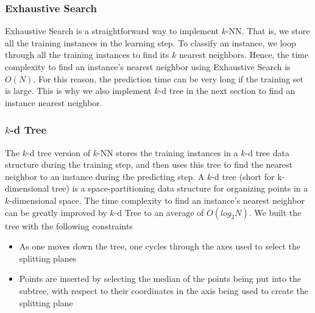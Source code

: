 \subsubsection{Exhaustive Search}
Exhaustive Search is a straightforward way to implement $k$-NN. That is, we store all the training instances in the learning step. To classify an instance, we loop through all the training instances to find its $k$ nearest neighbors. Hence, the time complexity to find an instance's nearest neighbor using Exhaustive Search is $O(N)$. For this reason, the prediction time can be very long if the training set is large. This is why we also implement $k$-d tree in the next section to find an instance nearest neighbor.

\subsubsection{$k$-d Tree}
The $k$-d tree version of $k$-NN stores the training instances in a $k$-d tree data structure during the training step, and then uses this tree to find the nearest neighbor to an instance during the predicting step. A $k$-d tree \cite{bentley1975multidimensional} (short for k-dimensional tree) is a space-partitioning data structure for organizing points in a $k$-dimensional space. The time complexity to find an instance's nearest neighbor can be greatly improved by $k$-d Tree to an average of $O(log_2N)$. We built the tree with the following constraints \cite{de2000computational}
\begin{itemize}
	\item As one moves down the tree, one cycles through the axes used to select the splitting planes
	\item Points are inserted by selecting the median of the points being put into the subtree, with respect to their coordinates in the axis being used to create the splitting plane
\end{itemize}